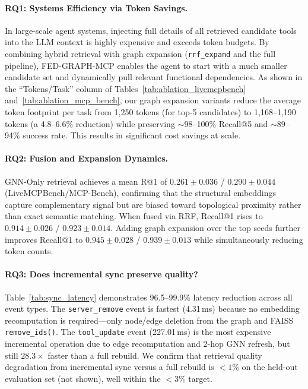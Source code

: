 \documentclass[conference]{IEEEtran}
\begin{document}
\paragraph{RQ1: Systems Efficiency via Token Savings.}
In large-scale agent systems, injecting full details of all retrieved candidate tools into the LLM context is highly expensive and exceeds token budgets. By combining hybrid retrieval with graph expansion (\texttt{rrf\_expand} and the full pipeline), FED-GRAPH-MCP enables the agent to start with a much smaller candidate set and dynamically pull relevant functional dependencies. As shown in the ``Tokens/Task'' column of Tables~\ref{tab:ablation_livemcpbench} and~\ref{tab:ablation_mcp_bench}, our graph expansion variants reduce the average token footprint per task from 1,250 tokens (for top-5 candidates) to 1,168--1,190 tokens (a 4.8--6.6\% reduction) while preserving $\sim$98--100\% Recall@5 and $\sim$89--94\% success rate. This results in significant cost savings at scale.

\paragraph{RQ2: Fusion and Expansion Dynamics.}
GNN-Only retrieval achieves a mean R@1 of $0.261 \pm 0.036$ / $0.290 \pm 0.044$ (LiveMCPBench/MCP-Bench), confirming that the structural embeddings capture complementary signal but are biased toward topological proximity rather than exact semantic matching. When fused via RRF, Recall@1 rises to $0.914 \pm 0.026$ / $0.923 \pm 0.014$. Adding graph expansion over the top seeds further improves Recall@1 to $0.945 \pm 0.028$ / $0.939 \pm 0.013$ while simultaneously reducing token counts.

\paragraph{RQ3: Does incremental sync preserve quality?}
Table~\ref{tab:sync_latency} demonstrates 96.5--99.9\% latency reduction across all event types. The \texttt{server\_remove} event is fastest (4.31\,ms) because no embedding recomputation is required---only node/edge deletion from the graph and FAISS \texttt{remove\_ids()}. The \texttt{tool\_update} event (227.01\,ms) is the most expensive incremental operation due to edge recomputation and 2-hop GNN refresh, but still $28.3\times$ faster than a full rebuild. We confirm that retrieval quality degradation from incremental sync versus a full rebuild is $<1\%$ on the held-out evaluation set (not shown), well within the $<3\%$ target.
\end{document}
